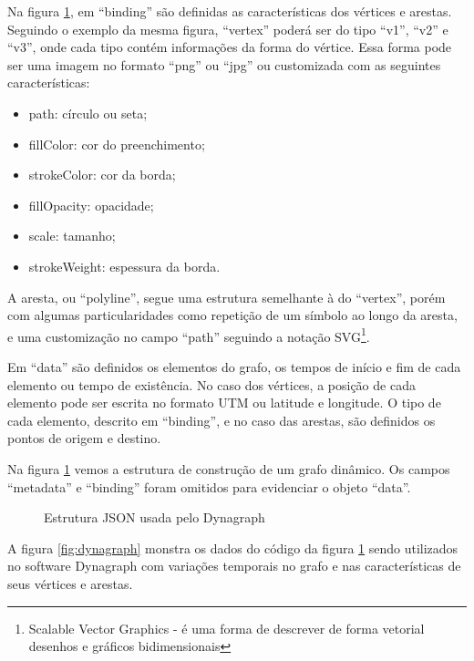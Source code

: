 Na figura \ref{fig:jsondynagraph}, em ``binding'' são definidas as características dos vértices e arestas.
Seguindo o exemplo da mesma figura, ``vertex'' poderá
ser do tipo ``v1'', ``v2'' e ``v3'', onde cada tipo contém informações da forma do vértice. Essa forma pode ser uma imagem no formato
``png'' ou ``jpg'' ou customizada com as seguintes características:
\begin{itemize}
\item path: círculo ou seta;
\item fillColor: cor do preenchimento;
\item strokeColor: cor da borda;
\item fillOpacity: opacidade;
\item scale: tamanho;
\item strokeWeight: espessura da borda.
\end{itemize}
A aresta, ou ``polyline'', segue uma estrutura semelhante à do ``vertex'', porém com algumas particularidades como repetição de um símbolo
ao longo da aresta, e uma customização no campo ``path'' seguindo a notação
SVG\footnote{\label{note} Scalable Vector Graphics - é uma forma de descrever de forma vetorial desenhos e gráficos bidimensionais}.

Em ``data'' são definidos os elementos do grafo, os tempos de início e fim de cada elemento ou tempo de existência.
No caso dos vértices, a posição de cada elemento pode ser escrita no formato UTM ou latitude e longitude.
O tipo de cada elemento, descrito em ``binding'', e no caso das arestas, são definidos os pontos de origem e destino.

Na figura \ref{fig:jsondynagraph} vemos a estrutura de construção de um grafo dinâmico.
Os campos ``metadata'' e ``binding'' foram omitidos para evidenciar o objeto ``data''.
\FloatBarrier

\begin{figure}[htbp]
  \caption{Estrutura JSON usada pelo Dynagraph}
  \label{fig:jsondynagraph}
\end{figure}

A figura \ref{fig:dynagraph} monstra os dados do código da figura \ref{fig:jsondynagraph} sendo utilizados no software
Dynagraph com variações temporais no grafo e nas características de seus vértices e arestas.

